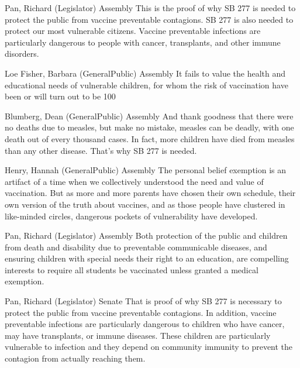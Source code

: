 \begin{result}{12.399020835139504}{Pan, Richard (Legislator) Assembly}
This is the proof of why SB 277 is needed to protect the public from vaccine preventable contagions. SB 277 is also needed to protect our most vulnerable citizens. Vaccine preventable infections are particularly dangerous to people with cancer, transplants, and other immune disorders.
\end{result}

\begin{result}{11.715124538755342}{Loe Fisher, Barbara (GeneralPublic) Assembly}
It fails to value the health and educational needs of vulnerable children, for whom the risk of vaccination have been or will turn out to be 100%
\end{result}

\begin{result}{10.650676879567987}{Blumberg, Dean (GeneralPublic) Assembly}
And thank goodness that there were no deaths due to measles, but make no mistake, measles can be deadly, with one death out of every thousand cases. In fact, more children have died from measles than any other disease. That's why SB 277 is needed.
\end{result}

\begin{result}{10.277112279676443}{Henry, Hannah (GeneralPublic) Assembly}
The personal belief exemption is an artifact of a time when we collectively understood the need and value of vaccination. But as more and more parents have chosen their own schedule, their own version of the truth about vaccines, and as those people have clustered in like-minded circles, dangerous pockets of vulnerability have developed.
\end{result}

\begin{result}{9.180445533243097}{Pan, Richard (Legislator) Assembly}
Both protection of the public and children from death and disability due to preventable communicable diseases, and ensuring children with special needs their right to an education, are compelling interests to require all students be vaccinated unless granted a medical exemption.
\end{result}

\begin{result}{9.135690999540271}{Pan, Richard (Legislator) Senate}
That is proof of why SB 277 is necessary to protect the public from vaccine preventable contagions. In addition, vaccine preventable infections are particularly dangerous to children who have cancer, may have transplants, or immune diseases. These children are particularly vulnerable to infection and they depend on community immunity to prevent the contagion from actually reaching them.
\end{result}

